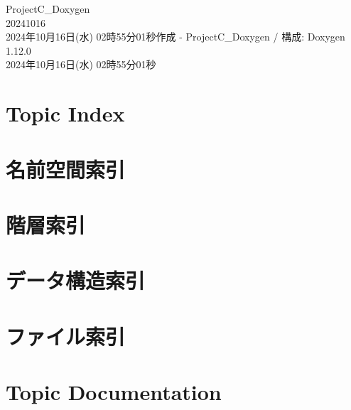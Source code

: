 \documentclass[twoside]{book}
\newcommand{\+}{\discretionary{\mbox{\scriptsize$\hookleftarrow$}}{}{}}
\newcommand{\clearemptydoublepage}{%
    \newpage{\pagestyle{empty}\cleardoublepage}%
  }
\begin{document}
  \raggedbottom
  \begin{CJK}{UTF8}{min}
    \hypersetup{pageanchor=false,
                bookmarksnumbered=true,
                pdfencoding=unicode
               }
  \begin{titlepage}
  \vspace*{7cm}
  \begin{center}%
  {\Large Project\+C\+\_\+\+Doxygen}\\
  [1ex]\large 20241016 \\
  \vspace*{1cm}
  {\large 2024年10月16日(水) 02時55分01秒作成 -\/ Project\+C\+\_\+\+Doxygen / 構成\+:  Doxygen 1.12.0}\\
    \vspace*{0.5cm}
    {\small 2024年10月16日(水) 02時55分01秒}
  \end{center}
  \end{titlepage}
  \clearemptydoublepage
  \tableofcontents
  \clearemptydoublepage
  \hypersetup{pageanchor=true}

\chapter{Topic Index}

\chapter{名前空間索引}

\chapter{階層索引}

\chapter{データ構造索引}

\chapter{ファイル索引}

\chapter{Topic Documentation}


\end{CJK}
\end{document}
